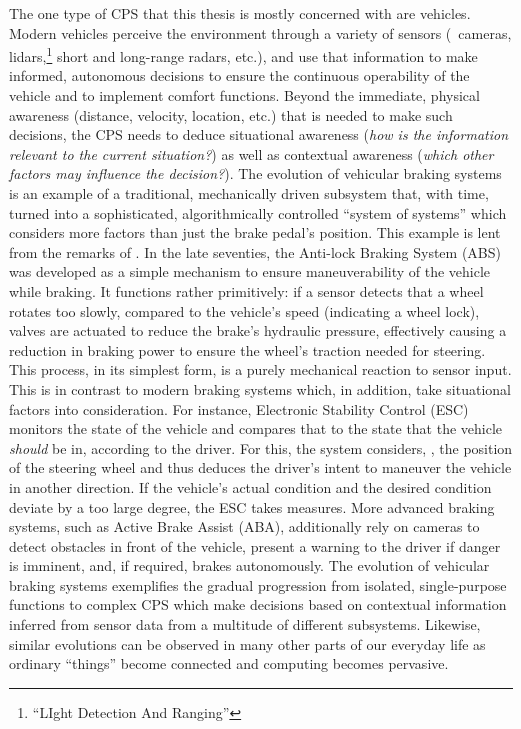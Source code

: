 The one type of CPS that this thesis is mostly concerned with are vehicles. Modern vehicles perceive the environment through a variety of sensors (\eg\ cameras, lidars,\footnote{``LIght Detection And Ranging''} short and long-range radars, etc.), and use that information to make informed, autonomous decisions to ensure the continuous operability of the vehicle and to implement comfort functions.  
Beyond the immediate, physical awareness (distance, velocity, location, etc.) that is needed to make such decisions, the CPS needs to deduce situational awareness (\emph{how is the information relevant to the current situation?}) as well as contextual awareness (\emph{which other factors may influence the decision?}). 
The evolution of vehicular braking systems is an example of a traditional, mechanically driven subsystem that, with time, turned into a sophisticated, algorithmically controlled ``system of systems'' which considers more factors than just the brake pedal's position. This example is lent from the remarks of \citeauthor*{broy2012cyber} \cite{broy2012cyber}.
In the late seventies, the Anti-lock Braking System (ABS) was developed as a simple mechanism to ensure maneuverability of the vehicle while braking. It functions rather primitively: if a sensor detects that a wheel rotates too slowly, compared to the vehicle's speed (indicating a wheel lock), valves are actuated to reduce the brake's hydraulic pressure, effectively causing a reduction in braking power to ensure the wheel's traction needed for steering. This process, in its simplest form, is a purely mechanical reaction to sensor input.
This is in contrast to modern braking systems which, in addition, take situational factors into consideration. For instance, Electronic Stability Control (ESC) monitors the state of the vehicle and compares that to the state that the vehicle \emph{should} be in, according to the driver. For this, the system considers, \eg , the position of the steering wheel and thus deduces the driver's intent to maneuver the vehicle in another direction. If the vehicle's actual condition and the desired condition deviate by a too large degree, the ESC takes measures. More advanced braking systems, such as Active Brake Assist (ABA), additionally rely on cameras to detect obstacles in front of the vehicle, present a warning to the driver if danger is imminent, and, if required, brakes autonomously.
The evolution of vehicular braking systems exemplifies the gradual progression from isolated, single-purpose functions to complex CPS which make decisions based on contextual information inferred from sensor data from a multitude of different subsystems. Likewise, similar evolutions can be observed in many other parts of our everyday life as ordinary ``things'' become connected and computing becomes pervasive.

